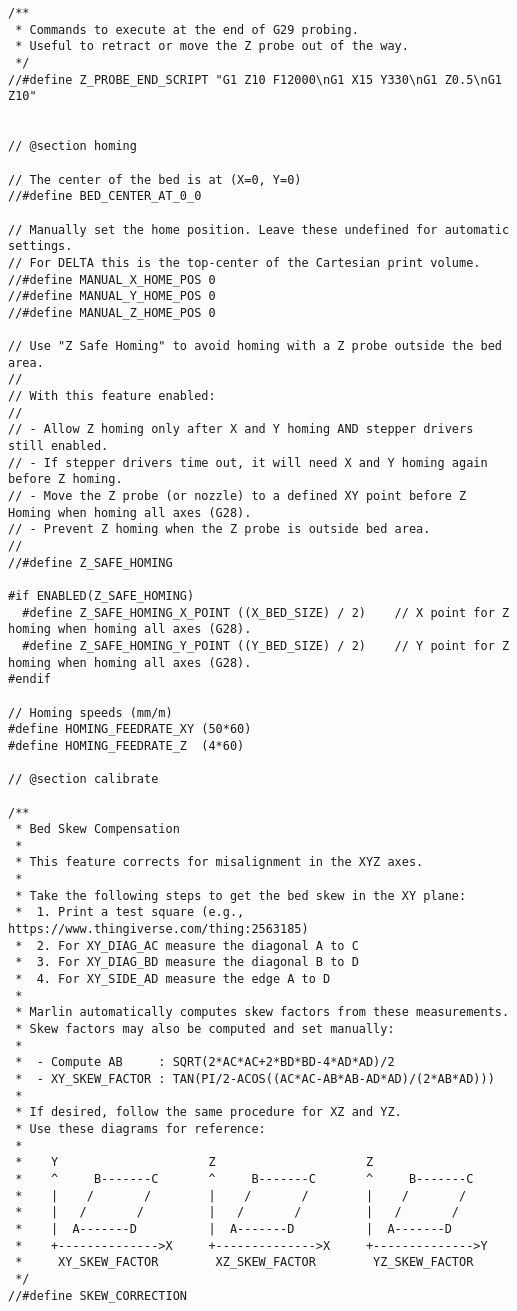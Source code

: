 \begin{lstlisting}
/**
 * Commands to execute at the end of G29 probing.
 * Useful to retract or move the Z probe out of the way.
 */
//#define Z_PROBE_END_SCRIPT "G1 Z10 F12000\nG1 X15 Y330\nG1 Z0.5\nG1 Z10"


// @section homing

// The center of the bed is at (X=0, Y=0)
//#define BED_CENTER_AT_0_0

// Manually set the home position. Leave these undefined for automatic settings.
// For DELTA this is the top-center of the Cartesian print volume.
//#define MANUAL_X_HOME_POS 0
//#define MANUAL_Y_HOME_POS 0
//#define MANUAL_Z_HOME_POS 0

// Use "Z Safe Homing" to avoid homing with a Z probe outside the bed area.
//
// With this feature enabled:
//
// - Allow Z homing only after X and Y homing AND stepper drivers still enabled.
// - If stepper drivers time out, it will need X and Y homing again before Z homing.
// - Move the Z probe (or nozzle) to a defined XY point before Z Homing when homing all axes (G28).
// - Prevent Z homing when the Z probe is outside bed area.
//
//#define Z_SAFE_HOMING

#if ENABLED(Z_SAFE_HOMING)
  #define Z_SAFE_HOMING_X_POINT ((X_BED_SIZE) / 2)    // X point for Z homing when homing all axes (G28).
  #define Z_SAFE_HOMING_Y_POINT ((Y_BED_SIZE) / 2)    // Y point for Z homing when homing all axes (G28).
#endif

// Homing speeds (mm/m)
#define HOMING_FEEDRATE_XY (50*60)
#define HOMING_FEEDRATE_Z  (4*60)

// @section calibrate

/**
 * Bed Skew Compensation
 *
 * This feature corrects for misalignment in the XYZ axes.
 *
 * Take the following steps to get the bed skew in the XY plane:
 *  1. Print a test square (e.g., https://www.thingiverse.com/thing:2563185)
 *  2. For XY_DIAG_AC measure the diagonal A to C
 *  3. For XY_DIAG_BD measure the diagonal B to D
 *  4. For XY_SIDE_AD measure the edge A to D
 *
 * Marlin automatically computes skew factors from these measurements.
 * Skew factors may also be computed and set manually:
 *
 *  - Compute AB     : SQRT(2*AC*AC+2*BD*BD-4*AD*AD)/2
 *  - XY_SKEW_FACTOR : TAN(PI/2-ACOS((AC*AC-AB*AB-AD*AD)/(2*AB*AD)))
 *
 * If desired, follow the same procedure for XZ and YZ.
 * Use these diagrams for reference:
 *
 *    Y                     Z                     Z
 *    ^     B-------C       ^     B-------C       ^     B-------C
 *    |    /       /        |    /       /        |    /       /
 *    |   /       /         |   /       /         |   /       /
 *    |  A-------D          |  A-------D          |  A-------D
 *    +-------------->X     +-------------->X     +-------------->Y
 *     XY_SKEW_FACTOR        XZ_SKEW_FACTOR        YZ_SKEW_FACTOR
 */
//#define SKEW_CORRECTION


\end{lstlisting}
